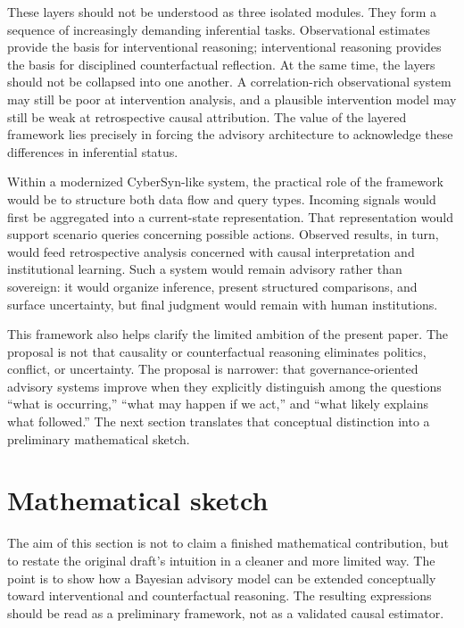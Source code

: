 \documentclass[11pt]{article}
\begin{document}
These layers should not be understood as three isolated modules. They form a sequence of increasingly demanding inferential tasks. Observational estimates provide the basis for interventional reasoning; interventional reasoning provides the basis for disciplined counterfactual reflection. At the same time, the layers should not be collapsed into one another. A correlation-rich observational system may still be poor at intervention analysis, and a plausible intervention model may still be weak at retrospective causal attribution. The value of the layered framework lies precisely in forcing the advisory architecture to acknowledge these differences in inferential status.

Within a modernized CyberSyn-like system, the practical role of the framework would be to structure both data flow and query types. Incoming signals would first be aggregated into a current-state representation. That representation would support scenario queries concerning possible actions. Observed results, in turn, would feed retrospective analysis concerned with causal interpretation and institutional learning. Such a system would remain advisory rather than sovereign: it would organize inference, present structured comparisons, and surface uncertainty, but final judgment would remain with human institutions.

This framework also helps clarify the limited ambition of the present paper. The proposal is not that causality or counterfactual reasoning eliminates politics, conflict, or uncertainty. The proposal is narrower: that governance-oriented advisory systems improve when they explicitly distinguish among the questions ``what is occurring,'' ``what may happen if we act,'' and ``what likely explains what followed.'' The next section translates that conceptual distinction into a preliminary mathematical sketch.

\section{Mathematical sketch}

The aim of this section is not to claim a finished mathematical contribution, but to restate the original draft's intuition in a cleaner and more limited way. The point is to show how a Bayesian advisory model can be extended conceptually toward interventional and counterfactual reasoning. The resulting expressions should be read as a preliminary framework, not as a validated causal estimator.
\end{document}
